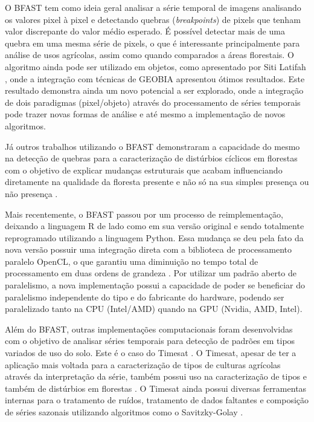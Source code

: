 \documentclass[12pt,a4paper]{article}
\begin{document}
O BFAST tem como ideia geral analisar a série temporal de imagens analisando os valores pixel à pixel e detectando quebras (\textit{breakpoints}) de pixels que tenham valor discrepante do valor médio esperado. É possível detectar mais de uma quebra em uma mesma série de pixels, o que é interessante principalmente para análise de usos agrícolas, assim como quando comparados a áreas florestais. O algoritmo ainda pode ser utilizado em objetos, como apresentado por Siti Latifah \citep{LATIFAH2016}, onde a integração com técnicas de GEOBIA apresentou ótimos resultados. Este resultado demonstra ainda um novo potencial a ser explorado, onde a integração de dois paradigmas (pixel/objeto) através do processamento de séries temporais pode trazer novas formas de análise e até mesmo a implementação de novos algoritmos.

Já outros trabalhos utilizando o BFAST demonstraram a capacidade do mesmo na detecção de quebras para a caracterização de distúrbios cíclicos em florestas com o objetivo de explicar mudanças estruturais que acabam influenciando diretamente na qualidade da floresta presente e não só na sua simples presença ou não presença \citep{JAKOVAC2017, DUTRIEUX2016112}.

Mais recentemente, o BFAST passou por um processo de reimplementação, deixando a linguagem R de lado como em sua versão original e sendo totalmente reprogramado utilizando a linguagem Python. Essa mudança se deu pela fato da nova versão possuir uma integração direta com a biblioteca de processamento paralelo OpenCL, o que garantiu uma diminuição no tempo total de processamento em duas ordens de grandeza \citep{Gieseke2020}. Por utilizar um padrão aberto de paralelismo, a nova implementação possui a capacidade de poder se beneficiar do paralelismo independente do tipo e do fabricante do hardware, podendo ser paralelizado tanto na CPU (Intel/AMD) quando na GPU (Nvidia, AMD, Intel).

Além do BFAST, outras implementações computacionais foram desenvolvidas com o objetivo de analisar séries temporais para detecção de padrões em tipos variados de uso do solo. Este é o caso do Timesat \citep{Jnsson2004TIMESATA}. O Timesat, apesar de ter a aplicação mais voltada para a caracterização de tipos de culturas agrícolas através da interpretação da série, também possui uso na caracterização de tipos e também de distúrbios em florestas \citep{Wenbo2017}. O Timesat ainda possui diversas ferramentas internas para o tratamento de ruídos, tratamento de dados faltantes e composição de séries sazonais utilizando algoritmos como o Savitzky-Golay \citep{Savitzky1964}.
\end{document}
